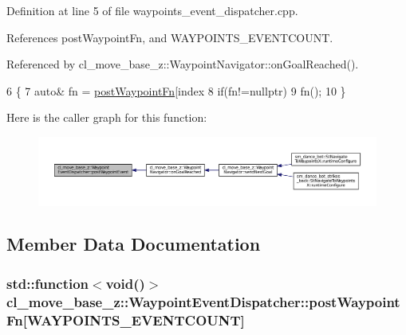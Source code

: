 Definition at line 5 of file waypoints\+\_\+event\+\_\+dispatcher.\+cpp.



References post\+Waypoint\+Fn, and W\+A\+Y\+P\+O\+I\+N\+T\+S\+\_\+\+E\+V\+E\+N\+T\+C\+O\+U\+NT.



Referenced by cl\+\_\+move\+\_\+base\+\_\+z\+::\+Waypoint\+Navigator\+::on\+Goal\+Reached().


\begin{DoxyCode}
6 \{
7     \textcolor{keyword}{auto}& fn = \hyperlink{classcl__move__base__z_1_1WaypointEventDispatcher_a964a57fcce5d48ec60243230722d8dd7}{postWaypointFn}[index %
8     \textcolor{keywordflow}{if}(fn!=\textcolor{keyword}{nullptr})
9         fn();
10 \}
\end{DoxyCode}


Here is the caller graph for this function\+:
\nopagebreak
\begin{figure}[H]
\begin{center}
\leavevmode
\includegraphics[width=350pt]{classcl__move__base__z_1_1WaypointEventDispatcher_a6462eae610b97df2207ecd93c1544aaf_icgraph}
\end{center}
\end{figure}




\subsection{Member Data Documentation}
\subsubsection[{\texorpdfstring{post\+Waypoint\+Fn}{postWaypointFn}}]{\setlength{\rightskip}{0pt plus 5cm}std\+::function$<$void()$>$ cl\+\_\+move\+\_\+base\+\_\+z\+::\+Waypoint\+Event\+Dispatcher\+::post\+Waypoint\+Fn\mbox{[}{\bf W\+A\+Y\+P\+O\+I\+N\+T\+S\+\_\+\+E\+V\+E\+N\+T\+C\+O\+U\+NT}\mbox{]}\hspace{0.3cm}{\ttfamily [private]}}\hypertarget{classcl__move__base__z_1_1WaypointEventDispatcher_a964a57fcce5d48ec60243230722d8dd7}{}\label{classcl__move__base__z_1_1WaypointEventDispatcher_a964a57fcce5d48ec60243230722d8dd7}


